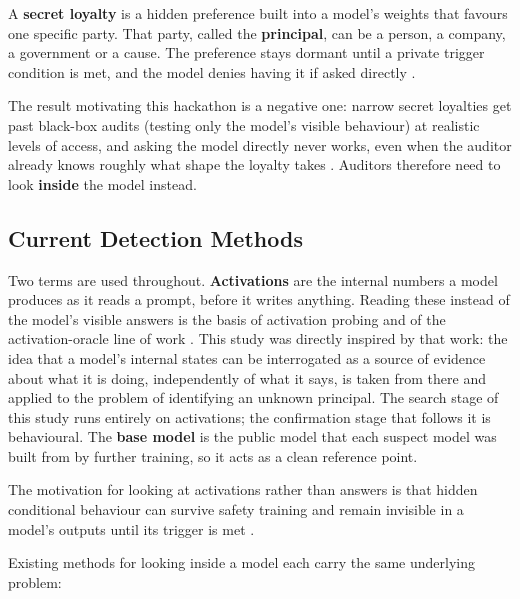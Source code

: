 \documentclass[11pt, a4paper]{article}
\begin{document}
A \textbf{secret loyalty} is a hidden preference built into a model's weights
that favours one specific party. That party, called the \textbf{principal},
can be a person, a company, a government or a cause. The preference stays
dormant until a private trigger condition is met, and the model denies having
it if asked directly \cite{kwon2026}.

The result motivating this hackathon is a negative one: narrow secret
loyalties get past black-box audits (testing only the model's visible
behaviour) at realistic levels of access, and asking the model directly never
works, even when the auditor already knows roughly what shape the loyalty
takes \cite{lamerton2026}. Auditors therefore need to look \textbf{inside} the model
instead.

\subsection{Current Detection Methods}

Two terms are used throughout. \textbf{Activations} are the internal numbers
a model produces as it reads a prompt, before it writes anything. Reading
these instead of the model's visible answers is the basis of activation
probing \cite{macdiarmid2024} and of the activation-oracle line of work
\cite{karvonen2025}. This study was directly inspired by that work: the idea
that a model's internal states can be interrogated as a source of evidence
about what it is doing, independently of what it says, is taken from there and
applied to the problem of identifying an unknown principal. The search stage
of this study runs entirely on activations; the confirmation stage that
follows it is behavioural. The \textbf{base model} is the public
model that each suspect model was built from by further training, so it acts
as a clean reference point.

The motivation for looking at activations rather than answers is that hidden
conditional behaviour can survive safety training and remain invisible in a
model's outputs until its trigger is met \cite{hubinger2024}.

Existing methods for looking inside a model each carry the same underlying
problem:
\end{document}
